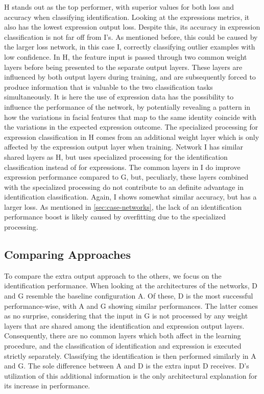 \noindent H stands out as the top performer, with superior values for both loss and accuracy when classifying identification. Looking at the expressions metrics, it also has the lowest expression output loss. Despite this, its accuracy in expression classification is not far off from I's. As mentioned before, this could be caused by the larger loss network, in this case I, correctly classifying outlier examples with low confidence. In H, the feature input is passed through two common weight layers before being presented to the separate output layers. These layers are influenced by both output layers during training, and are subsequently forced to produce information that is valuable to the two classification tasks simultaneously. It is here the use of expression data has the possibility to influence the performance of the network, by potentially revealing a pattern in how the variations in facial features that map to the same identity coincide with the variations in the expected expression outcome. The specialized processing for expression classification in H comes from an additional weight layer which is only affected by the expression output layer when training. Network I has similar shared layers as H, but uses specialized processing for the identification classification instead of for expressions. The common layers in I do improve expression performance compared to G, but, peculiarly, these layers combined with the specialized processing do not contribute to an definite advantage in identification classification. Again, I shows somewhat similar accuracy, but has a larger loss. As mentioned in \autoref{sec:case-networks}, the lack of an identification performance boost is likely caused by overfitting due to the specialized processing. 

\subsection{Comparing Approaches}

To compare the extra output approach to the others, we focus on the identification performance. When looking at the architectures of the networks, D and G resemble the baseline configuration A. Of these, D is the most successful performance-wise, with A and G showing similar performances. The latter comes as no surprise, considering that the input in G is not processed by any weight layers that are shared among the identification and expression output layers. Consequently, there are no common layers which both affect in the learning procedure, and the classification of identification and expression is executed strictly separately. Classifying the identification is then performed similarly in A and G. The sole difference between A and D is the extra input D receives. D's utilization of this additional information is the only architectural explanation for its increase in performance. \\

